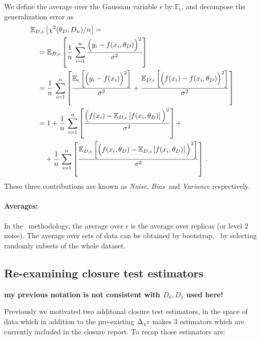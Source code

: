 We define the average over the Gaussian variable $\epsilon$ by
$\mathbb{E}_\epsilon$, and decompose the generalization error as 
\begin{align}
    \label{eq:GenErr}
    &\mathbb{E}_{D,\epsilon}\left[\chi^2(\theta_D; D_n)/n\right] = \nonumber \\
    &\quad = \mathbb{E}_{D,\epsilon}\left[
        \frac{1}{n}\, \sum_{i=1}^n 
        \frac{\Big(
            y_i - f(x_i,\theta_D)
        \Big)^2}{\sigma^2}   
    \right] \\
    &\quad = \frac{1}{n}\, \sum_{i=1}^n \left[
        \frac{\mathbb{E}_\epsilon\left[
            \Big(y_i - f(x_i)\Big)^2    
        \right]}{\sigma^2}    
        + \frac{\mathbb{E}_{D,\epsilon}\left[\Big(f(x_i)-f(x_i,\theta_D)\Big)^2\right]}{\sigma^2}
    \right] \\
    &\quad = 1 + \frac{1}{n}\, \sum_{i=1}^n \left[
            \frac{\Big(f(x_i) - \mathbb{E}_{D,\epsilon}\left[f(x_i,\theta_D)\right]\Big)^2}{\sigma^2}
        \right] + \nonumber \\
    &\quad \quad +
        \frac{1}{n}\, \sum_{i=1}^n \left[
            \frac{
                \mathbb{E}_{D,\epsilon}\left[\Big(f(x_i,\theta_D) - 
                \mathbb{E}_{D,\epsilon}\left[f(x_i,\theta_D)\right]\Big)^2\right]
            }{\sigma^2}
        \right]\, . 
\end{align}
These three contributions are known as {\em Noise}, {\em Bias}\ and {\em Variance} respectively.

\paragraph[]{Averages:} In the \nnpdf\ methodology, the average over $\epsilon$
is the average over replicas (or level 2 noise). The average over sets of data
can be obtained by bootstrap, \ie\ by selecting randomly subsets of the whole
dataset.  

\subsection{Re-examining closure test estimators}

{\bf my previous notation is not consistent with $D_0, D_1$ used here!}

Previously we motivated two additonal closure test estimators, in the space of data
which in addition to the pre-existing $\Delta_{\chi^{2}}$ makes 3 estimators which are currently
included in the \vphys closure report. To recap those estimators are:

